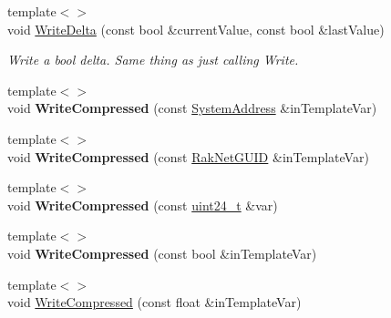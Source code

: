 \begin{DoxyCompactItemize}
\item 
{\footnotesize template$<$$>$ }\\void \hyperlink{class_rak_net_1_1_bit_stream_ad69701ef7d6efe0f69d61ff8287ccb78}{Write\-Delta} (const bool \&current\-Value, const bool \&last\-Value)
\begin{DoxyCompactList}\small\item\em Write a bool delta. Same thing as just calling Write. \end{DoxyCompactList}\item 
\hypertarget{class_rak_net_1_1_bit_stream_a670fdb16b6fa6d6d898f21092bd7403b}{{\footnotesize template$<$$>$ }\\void {\bfseries Write\-Compressed} (const \hyperlink{struct_rak_net_1_1_system_address}{System\-Address} \&in\-Template\-Var)}\label{class_rak_net_1_1_bit_stream_a670fdb16b6fa6d6d898f21092bd7403b}

\item 
\hypertarget{class_rak_net_1_1_bit_stream_adb8f6c76fc209d12b636855b518e1312}{{\footnotesize template$<$$>$ }\\void {\bfseries Write\-Compressed} (const \hyperlink{struct_rak_net_1_1_rak_net_g_u_i_d}{Rak\-Net\-G\-U\-I\-D} \&in\-Template\-Var)}\label{class_rak_net_1_1_bit_stream_adb8f6c76fc209d12b636855b518e1312}

\item 
\hypertarget{class_rak_net_1_1_bit_stream_ab82ce7b607f3c87b65f8d92e6bd432ef}{{\footnotesize template$<$$>$ }\\void {\bfseries Write\-Compressed} (const \hyperlink{struct_rak_net_1_1uint24__t}{uint24\-\_\-t} \&var)}\label{class_rak_net_1_1_bit_stream_ab82ce7b607f3c87b65f8d92e6bd432ef}

\item 
\hypertarget{class_rak_net_1_1_bit_stream_a4a6fed7408841beef461c6d979a161e5}{{\footnotesize template$<$$>$ }\\void {\bfseries Write\-Compressed} (const bool \&in\-Template\-Var)}\label{class_rak_net_1_1_bit_stream_a4a6fed7408841beef461c6d979a161e5}

\item 
\hypertarget{class_rak_net_1_1_bit_stream_aa9f89758b7be3a989c530ebd296c3e78}{{\footnotesize template$<$$>$ }\\void \hyperlink{class_rak_net_1_1_bit_stream_aa9f89758b7be3a989c530ebd296c3e78}{Write\-Compressed} (const float \&in\-Template\-Var)}\label{class_rak_net_1_1_bit_stream_aa9f89758b7be3a989c530ebd296c3e78}


\end{DoxyCompactItemize}

